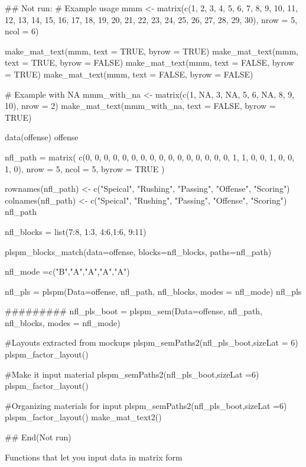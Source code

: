 \documentclass[a4paper]{book}
\begin{document}
\begin{Examples}
\begin{ExampleCode}

\#\# Not run: 
# Example usage
mmm <- matrix(c(1, 2, 3, 4, 5, 6, 7, 8, 9,
10, 11, 12, 13, 14, 15, 16, 17, 18, 19, 20,
21, 22, 23, 24, 25, 26, 27, 28, 29, 30),
 nrow = 5, ncol = 6)

make_mat_text(mmm, text = TRUE, byrow = TRUE)
make_mat_text(mmm, text = TRUE, byrow = FALSE)
make_mat_text(mmm, text = FALSE, byrow = TRUE)
make_mat_text(mmm, text = FALSE, byrow = FALSE)

# Example with NA
mmm_with_na <- matrix(c(1, NA, 3, NA, 5, 6, NA, 8, 9, 10), nrow = 2)
make_mat_text(mmm_with_na, text = FALSE, byrow = TRUE)

data(offense)
offense %

nfl_path = matrix(
  c(0, 0, 0, 0, 0,
    0, 0, 0, 0, 0,
    0, 0, 0, 0, 0,
    0, 1, 1, 0, 0,
    1, 0, 0, 1, 0),
  nrow = 5, ncol = 5, byrow = TRUE )

rownames(nfl_path) <- c("Speical", "Rushing",
"Passing", "Offense", "Scoring")
colnames(nfl_path) <- c("Speical", "Rushing",
"Passing", "Offense", "Scoring")
nfl_path

nfl_blocks = list(7:8, 1:3, 4:6,1:6, 9:11)

plspm_blocks_match(data=offense, blocks=nfl_blocks,
                   paths=nfl_path)

nfl_mode =c("B","A","A","A","A")

nfl_pls = plspm(Data=offense, nfl_path, nfl_blocks, modes = nfl_mode)
nfl_pls%

#########
nfl_pls_boot = plspm_sem(Data=offense, nfl_path,
 nfl_blocks, modes = nfl_mode)

#Layouts extracted from mockups
plspm_semPaths2(nfl_pls_boot,sizeLat = 6)%
  plspm_factor_layout()

#Make it input material
plspm_semPaths2(nfl_pls_boot,sizeLat =6)%
  plspm_factor_layout() %

#Organizing materials for input
plspm_semPaths2(nfl_pls_boot,sizeLat =6)%
  plspm_factor_layout() %
  make_mat_text2()

## End(Not run)

\end{ExampleCode}
\end{Examples}
%
\begin{Description}
Functions that let you input data in matrix form
\end{Description}
\end{document}
